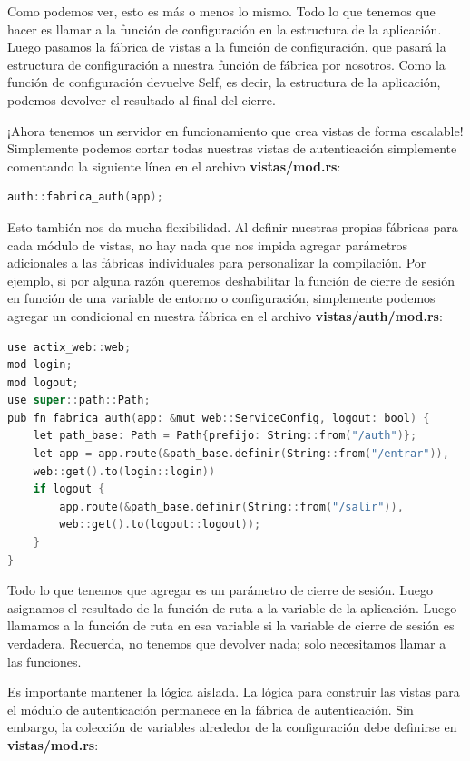 Como podemos ver, esto es más o menos lo mismo. Todo lo que tenemos que hacer es llamar a la función de configuración en la estructura de la aplicación. Luego pasamos la fábrica de vistas a la función de configuración, que pasará la estructura de configuración a nuestra función de fábrica por nosotros. Como la función de configuración devuelve Self, es decir, la estructura de la aplicación, podemos devolver el resultado al final del cierre.

¡Ahora tenemos un servidor en funcionamiento que crea vistas de forma escalable! Simplemente podemos cortar todas nuestras vistas de autenticación simplemente comentando la siguiente línea en el archivo \textbf{vistas/mod.rs}:
\begin{lstlisting}[language=C]
auth::fabrica_auth(app);
\end{lstlisting}


Esto también nos da mucha flexibilidad. Al definir nuestras propias fábricas para cada módulo de vistas, no hay nada que nos impida agregar parámetros adicionales a las fábricas individuales para personalizar la compilación. Por ejemplo, si por alguna razón queremos deshabilitar la función de cierre de sesión en función de una variable de entorno o configuración, simplemente podemos agregar un condicional en nuestra fábrica en el archivo \textbf{vistas/auth/mod.rs}:

\begin{lstlisting}[language=C]
use actix_web::web;
mod login;
mod logout;
use super::path::Path;
pub fn fabrica_auth(app: &mut web::ServiceConfig, logout: bool) {
	let path_base: Path = Path{prefijo: String::from("/auth")};
	let app = app.route(&path_base.definir(String::from("/entrar")), 
	web::get().to(login::login))
	if logout {
		app.route(&path_base.definir(String::from("/salir")), 
		web::get().to(logout::logout));
	}
}
\end{lstlisting}

Todo lo que tenemos que agregar es un parámetro de cierre de sesión. Luego asignamos el resultado de la función de ruta a la variable de la aplicación. Luego llamamos a la función de ruta en esa variable si la variable de cierre de sesión es verdadera. Recuerda, no tenemos que devolver nada; solo necesitamos llamar a las funciones.

Es importante mantener la lógica aislada. La lógica para construir las vistas para el módulo de autenticación permanece en la fábrica de autenticación. Sin embargo, la colección de variables alrededor de la configuración debe definirse en \textbf{vistas/mod.rs}:

